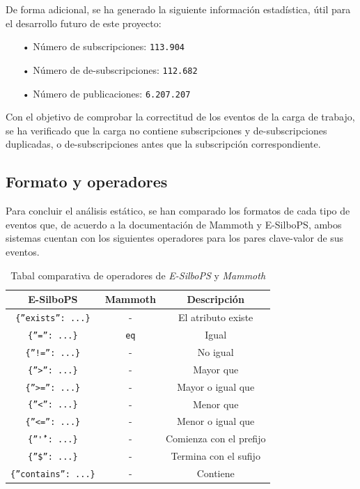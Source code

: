 De forma adicional, se ha generado la siguiente información estadística, útil para el desarrollo 
futuro de este proyecto:
\begin{itemize}
    \item[•] Número de subscripciones: \texttt{113.904}
    \item[•] Número de de-subscripciones: \texttt{112.682}
    \item[•] Número de publicaciones: \texttt{6.207.207}
\end{itemize}

Con el objetivo de comprobar la correctitud de los eventos de la carga de trabajo, se ha verificado
que la carga no contiene subscripciones y de-subscripciones duplicadas, o de-subscripciones antes que 
la subscripción correspondiente.


\subsection{Formato y operadores} \label{ssct:desarrollo_carga_formato}

Para concluir el análisis estático, se han comparado los formatos de cada tipo 
de eventos que, de acuerdo a la documentación de Mammoth\cite{paper:mammoth_paper} 
y E-SilboPS\cite{thesis:tesisVictor}, ambos sistemas cuentan con los siguientes
operadores para los pares clave-valor de sus eventos.

\begin{table}[htpb]
    \centering
    \begin{tabular}{|c|c|c|}
        \hline
        \textbf{E-SilboPS} & \textbf{Mammoth} & \textbf{Descripción} \\
        \hline
        \texttt{\{''exists'': ...\}}   & -  & El atributo existe \\
        \texttt{\{''='': ...\}}        & \texttt{eq} & Igual \\
        \texttt{\{''!='': ...\}}       & -  & No igual \\
        \texttt{\{''>'': ...\}}        & -  & Mayor que \\
        \texttt{\{''>='': ...\}}       & -  & Mayor o igual que \\
        \texttt{\{''<'': ...\}}        & -  & Menor que \\
        \texttt{\{''<='': ...\}}       & -  & Menor o igual que \\
        \texttt{\{''\^'': ...\}}       & -  & Comienza con el prefijo \\
        \texttt{\{''\$'': ...\}}       & -  & Termina con el sufijo \\
        \texttt{\{''contains'': ...\}} & -  & Contiene \\
        \hline
    \end{tabular}
    \caption{Tabal comparativa de operadores de \textit{E-SilboPS} y \textit{Mammoth}}
    \label{tab:comparadores}
\end{table}

